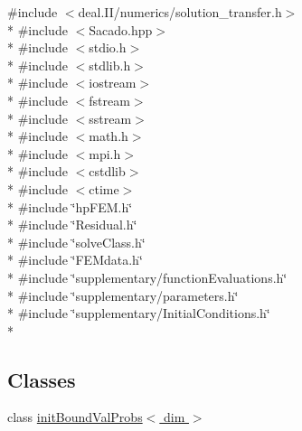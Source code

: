 {\ttfamily \#include $<$deal.\-I\-I/numerics/solution\-\_\-transfer.\-h$>$}\\*
{\ttfamily \#include $<$Sacado.\-hpp$>$}\\*
{\ttfamily \#include $<$stdio.\-h$>$}\\*
{\ttfamily \#include $<$stdlib.\-h$>$}\\*
{\ttfamily \#include $<$iostream$>$}\\*
{\ttfamily \#include $<$fstream$>$}\\*
{\ttfamily \#include $<$sstream$>$}\\*
{\ttfamily \#include $<$math.\-h$>$}\\*
{\ttfamily \#include $<$mpi.\-h$>$}\\*
{\ttfamily \#include $<$cstdlib$>$}\\*
{\ttfamily \#include $<$ctime$>$}\\*
{\ttfamily \#include \char`\"{}hp\-F\-E\-M.\-h\char`\"{}}\\*
{\ttfamily \#include \char`\"{}Residual.\-h\char`\"{}}\\*
{\ttfamily \#include \char`\"{}solve\-Class.\-h\char`\"{}}\\*
{\ttfamily \#include \char`\"{}F\-E\-Mdata.\-h\char`\"{}}\\*
{\ttfamily \#include \char`\"{}supplementary/function\-Evaluations.\-h\char`\"{}}\\*
{\ttfamily \#include \char`\"{}supplementary/parameters.\-h\char`\"{}}\\*
{\ttfamily \#include \char`\"{}supplementary/\-Initial\-Conditions.\-h\char`\"{}}\\*
\subsection*{Classes}
\begin{DoxyCompactItemize}
\item 
class \hyperlink{classinit_bound_val_probs}{init\-Bound\-Val\-Probs$<$ dim $>$}
\end{DoxyCompactItemize}
